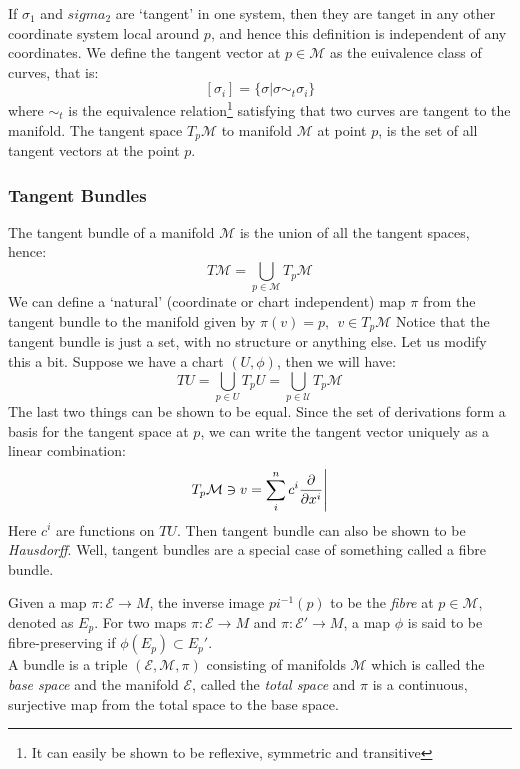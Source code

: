 If $\sigma_1$ and $sigma_2$ are `tangent' in one system, then they are tanget in any other coordinate system local around $p$, and hence this definition is independent of any coordinates. We define the tangent vector at $p \in \mathcal{M}$ as the euivalence class of curves, that is:
$$[\sigma_i] = \{\sigma | \sigma \sim_t \sigma_i \}$$
where $\sim_t$ is the equivalence relation\footnote{It can easily be shown to be reflexive, symmetric and transitive} satisfying that two curves are tangent to the manifold. The tangent space $T_p\mathcal{M}$ to manifold $\mathcal{M}$ at point $p$, is the set of all tangent vectors at the point $p$. 
\subsubsection{Tangent Bundles}
The tangent bundle of a manifold $\mathcal{M}$ is the union of all the tangent spaces, hence: 
$$T\mathcal{M} = \bigcup\limits_{p\in \mathcal{M}}T_p\mathcal{M}$$
We can define a `natural' (coordinate or chart independent) map $\pi$ from the tangent bundle to the manifold given by $\pi(v) = p, \ \ v \in T_p\mathcal{M}$
Notice that the tangent bundle is just a set, with no structure or anything else. Let us modify this a bit. Suppose we have a chart $(U,\phi)$, then we will have:
$$TU =  \bigcup\limits_{p\in {U}}T_p{U}= \bigcup\limits_{p\in \mathcal{U}}T_p\mathcal{M}$$ 
The last two things can be shown to be equal. Since the set of derivations form a basis for the tangent space at $p$, we can write the tangent vector uniquely as a linear combination:
$$T_p\mathcal{M}\ni v = \sum\limits_{i}^n c^i \pdv{x^i}\Bigg|$$
Here $c^i$ are functions on $TU$. Then tangent bundle can also be shown to be \textit{Hausdorff}. Well, tangent bundles are a special case of something called a fibre bundle. 
\begin{definition}[Bundle]
  Given a map $\pi: \mathcal{E}\rightarrow M$, the inverse image $pi^{-1}(p)$ to be the \textit{fibre} at $p\in \mathcal{M}$, denoted as $E_p$. For two maps $\pi: \mathcal{E}\rightarrow M$ and $\pi: \mathcal{E}'\rightarrow M$, a map $\phi$ is said to be fibre-preserving if $\phi(E_p)\subset E_p'$.\\[0.2cm]
  A bundle is a triple $(\mathcal{E},\mathcal{M},\pi)$ consisting of manifolds $\mathcal{M}$ which is called the \textit{base space} and the manifold $\mathcal{E}$, called the \textit{total space} and $\pi$ is a continuous, surjective map from the total space to the base space.  
\end{definition}

